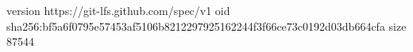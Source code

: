 version https://git-lfs.github.com/spec/v1
oid sha256:bf5a6f0795e57453af5106b8212297925162244f3f66ce73c0192d03db664cfa
size 87544
